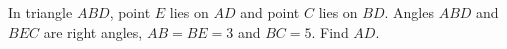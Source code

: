 In triangle $ABD$, point $E$ lies on $AD$ and point $C$ lies on $BD$. Angles $ABD$ and $BEC$ are right angles, $AB=BE=3$ and $BC=5$. Find $AD$.
